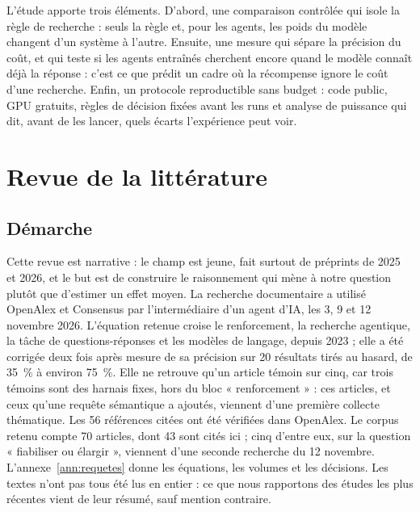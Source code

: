 \documentclass[11pt,a4paper]{article}
\begin{document}
L'étude apporte trois éléments. D'abord, une comparaison contrôlée qui isole la règle de recherche : seuls la règle et, pour les agents, les poids du modèle changent d'un système à l'autre. Ensuite, une mesure qui sépare la précision du coût, et qui teste si les agents entraînés cherchent encore quand le modèle connaît déjà la réponse : c'est ce que prédit un cadre où la récompense ignore le coût d'une recherche. Enfin, un protocole reproductible sans budget : code public, GPU gratuits, règles de décision fixées avant les runs et analyse de puissance qui dit, avant de les lancer, quels écarts l'expérience peut voir.

\section{Revue de la littérature}\label{sec:revue}

\subsection{Démarche}
Cette revue est narrative : le champ est jeune, fait surtout de préprints de 2025 et 2026, et le but est de construire le raisonnement qui mène à notre question plutôt que d'estimer un effet moyen. La recherche documentaire a utilisé OpenAlex et Consensus par l'intermédiaire d'un agent d'IA, les 3, 9 et 12 novembre 2026. L'équation retenue croise le renforcement, la recherche agentique, la tâche de questions-réponses et les modèles de langage, depuis 2023 ; elle a été corrigée deux fois après mesure de sa précision sur 20 résultats tirés au hasard, de 35~\% à environ 75~\%. Elle ne retrouve qu'un article témoin sur cinq, car trois témoins sont des harnais fixes, hors du bloc « renforcement » : ces articles, et ceux qu'une requête sémantique a ajoutés, viennent d'une première collecte thématique. Les 56 références citées ont été vérifiées dans OpenAlex. Le corpus retenu compte 70 articles, dont 43 sont cités ici ; cinq d'entre eux, sur la question « fiabiliser ou élargir », viennent d'une seconde recherche du 12 novembre. L'annexe~\ref{ann:requetes} donne les équations, les volumes et les décisions. Les textes n'ont pas tous été lus en entier : ce que nous rapportons des études les plus récentes vient de leur résumé, sauf mention contraire.
\end{document}
